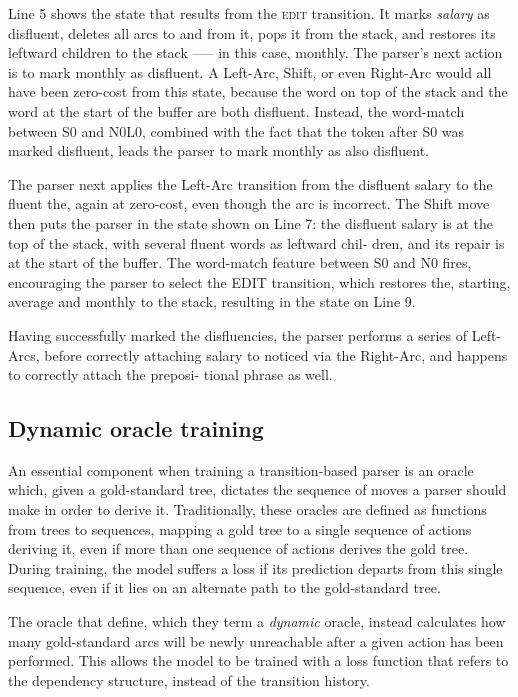 \documentclass[11pt,letterpaper]{article}
\newcommand{\edittrans}{\textsc{edit}\xspace}
\begin{document}
Line 5 shows the state that results from the \edittrans transition. It marks
\emph{salary} as disfluent, deletes all arcs to and from it, pops it from the
stack, and restores its leftward children to the stack —-- in this case, monthly.
The parser’s next action is to mark monthly as disfluent. A Left-Arc, Shift, or
even Right-Arc would all have been zero-cost from this state, because the word
on top of the stack and the word at the start of the buffer are both disfluent.
Instead, the word-match between S0 and N0L0, combined with the fact that the token
after S0 was marked disfluent, leads the parser to mark monthly as also disfluent.

The parser next applies the Left-Arc transition from the disfluent salary to the
fluent the, again at zero-cost, even though the arc is incorrect. The Shift move
then puts the parser in the state shown on Line 7: the disfluent salary is at
the top of the stack, with several fluent words as leftward chil- dren, and its
repair is at the start of the buffer. The word-match feature between S0 and N0
fires, encouraging the parser to select the EDIT transition, which restores the,
starting, average and monthly to the stack, resulting in the state on Line 9.

Having successfully marked the disfluencies, the parser performs a series of
Left-Arcs, before correctly attaching salary to noticed via the Right-Arc,
and happens to correctly attach the preposi- tional phrase as well.

\subsection{Dynamic oracle training}

An essential component when training a transition-based parser is an oracle which,
given a gold-standard tree, dictates the sequence of moves a parser should make
in order to derive it. Traditionally, these oracles are defined as functions from
trees to sequences, mapping a gold tree to a single sequence of actions deriving it,
even if more than one sequence of actions derives the gold tree. During training,
the model suffers a loss if its prediction departs from this single 
sequence, even if it lies on an alternate path to the gold-standard tree.

The oracle that \citet{goldberg:12} define, which they term a \emph{dynamic} oracle,
instead calculates how many gold-standard arcs will be newly unreachable after a
given action has been performed. This allows the model to be trained with a
loss function that refers to the dependency structure, instead of the transition
history.  
\end{document}
